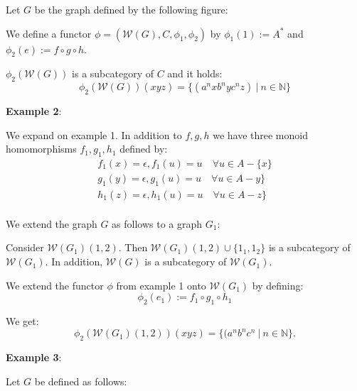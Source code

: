 Let $G$ be the graph defined by the following figure:


We define a functor $\phi = (\mathcal{W}(G), C, \phi_1, \phi_2)$ by $\phi_1(1)
:= A^*$ and $\phi_2(e) := f \circ g \circ h$.

$\phi_2(\mathcal{W}(G))$ is a subcategory of $C$ and it holds:
\[ \phi_2(\mathcal{W}(G))(xyz) = \{ (a^n x b^n y c^n z)\ |\ n \in \mathbb{N} \}
\]

{\bf Example 2}:

We expand on example 1. In addition to $f,g,h$ we have three monoid
homomorphisms $f_1,g_1,h_1$ defined by:
\begin{eqnarray*}
f_1(x) = \epsilon, f_1(u) = u \quad\forall u \in A - \{x\} \\
g_1(y) = \epsilon, g_1(u) = u \quad\forall u \in A - y\} \\
h_1(z) = \epsilon, h_1(u) = u \quad\forall u \in A - z\} \\
\end{eqnarray*}

We extend the graph $G$ as follows to a graph $G_1$:


Consider $\mathcal{W}(G_1)(1,2)$. Then $\mathcal{W}(G_1)(1,2) \cup \{1_1,
1_2\}$ is a subcategory of $\mathcal{W}(G_1)$. In addition, $\mathcal{W}(G)$ is
a subcategory of $\mathcal{W}(G_1)$. 

We extend the functor $\phi$ from example 1
onto $\mathcal{W}(G_1)$ by defining:
\[ \phi_2(e_1) := f_1 \circ g_1 \circ h_1 \]

We get:
\[ \phi_2(\mathcal{W}(G_1)(1,2))(xyz) = \{ (a^n b^n c^n\ |\ n \in \mathbb{N} \}.
\]

{\bf Example 3}:

Let $G$ be defined as follows:


